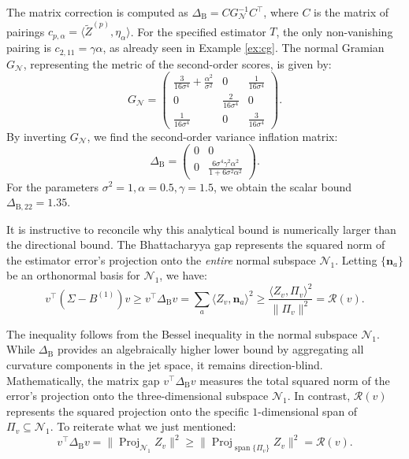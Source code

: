 \documentclass[pdflatex,sn-mathphys-num]{sn-jnl}%
\theoremstyle{thmstyleone}%
\theoremstyle{thmstyletwo}%
\theoremstyle{thmstylethree}%
\begin{document}
The matrix correction is computed as $\Delta_{\mathrm{B}} = C G_{\mathcal{N}}^{-1} C^\top$, where $C$ is the matrix of pairings $c_{p,\alpha} = \langle \widetilde{Z}^{(p)}, \eta_\alpha \rangle$. For the specified estimator $T$, the only non-vanishing pairing is $c_{2,11} = \gamma\alpha$, as already seen in Example \ref{ex:cg}. The normal Gramian $G_{\mathcal{N}}$, representing the metric of the second-order scores, is given by:
\[
G_{\mathcal{N}} = \begin{pmatrix} \frac{3}{16\sigma^4} + \frac{\alpha^2}{\sigma^2} & 0 & \frac{1}{16\sigma^4} \\ 0 & \frac{2}{16\sigma^4} & 0 \\ \frac{1}{16\sigma^4} & 0 & \frac{3}{16\sigma^4} \end{pmatrix}.
\]
By inverting $G_{\mathcal{N}}$, we find the second-order variance inflation matrix:
\[
\Delta_{\mathrm{B}} = \begin{pmatrix} 0 & 0 \\ 0 & \frac{6\sigma^4 \gamma^2 \alpha^2}{1 + 6\sigma^2 \alpha^2} \end{pmatrix}.
\]
For the parameters $\sigma^2=1, \alpha=0.5, \gamma=1.5$, we obtain the scalar bound $\Delta_{\mathrm{B}, 22} = 1.35$. 

It is instructive to reconcile why this analytical bound is numerically larger than the directional bound. The Bhattacharyya gap represents the squared norm of the estimator error's projection onto the \textit{entire} normal subspace $\mathcal{N}_1$. Letting $\{\mathbf{n}_a\}$ be an orthonormal basis for $\mathcal{N}_1$, we have:
\[
v^\top (\Sigma - B^{(1)}) v \ge v^\top \Delta_{\mathrm{B}} v = \sum_{a} \langle Z_v, \mathbf{n}_a \rangle^2 \ge \frac{\langle Z_v, \Pi_v \rangle^2}{\|\Pi_v\|^2} = \mathcal{R}(v).
\]

The inequality follows from the Bessel inequality in the normal subspace $\mathcal{N}_1$. While $\Delta_{\mathrm{B}}$ provides an algebraically higher lower bound by aggregating all curvature components in the jet space, it remains direction-blind. Mathematically, the matrix gap $v^\top \Delta_{\mathrm{B}} v$ measures the total squared norm of the error's projection onto the three-dimensional subspace $\mathcal{N}_1$. In contrast, $\mathcal{R}(v)$ represents the squared projection onto the specific $1$-dimensional span of $\Pi_v \subseteq \mathcal{N}_1$. To reiterate what we just mentioned:
\[
v^\top \Delta_{\mathrm{B}} v = \|\operatorname{Proj}_{\mathcal{N}_1} Z_v\|^2 \ge \|\operatorname{Proj}_{\operatorname{span}\{\Pi_v\}} Z_v\|^2 = \mathcal{R}(v).
\]
\end{document}

